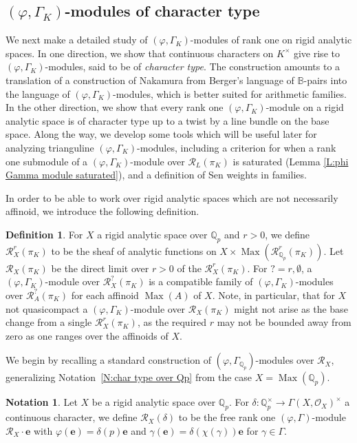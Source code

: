\documentclass[12pt]{article}
\theoremstyle{definition}
\newtheorem{defn}[theorem]{Definition}
\newtheorem{notation}[theorem]{Notation}
\numberwithin{equation}{theorem}
\newcommand{\calO}{\mathcal{O}}
\newcommand{\calR}{\mathcal{R}}
\newcommand{\QQ}{\mathbb{Q}}
\newcommand{\bbe}{\mathbf{e}}
\def\Qp{\QQ_p}
\DeclareMathOperator{\Max}{Max}
\begin{document}
\subsection{$(\varphi,\Gamma_K)$-modules of character type}\label{SS:rank one}

We next make a detailed study of $(\varphi, \Gamma_K)$-modules of rank one on rigid analytic spaces. 
In one direction, we show that continuous characters on $K^\times$ give rise to $(\varphi, \Gamma_K)$-modules, said to be of \emph{character type}. The construction
amounts to a translation of a construction of Nakamura \cite{nakamura2}
from Berger's language of $\mathbb{B}$-pairs into the language of
$(\varphi, \Gamma_K)$-modules, which is better suited for arithmetic families. In the other direction, we show that every rank one $(\varphi, \Gamma_K)$-module on a rigid analytic space is of character type up to a twist by a line bundle on the base space.
Along the way, we develop some tools which will be useful later for analyzing trianguline $(\varphi, \Gamma_K)$-modules, including a criterion for when a rank one submodule of a $(\varphi,\Gamma_K)$-module over $\calR_L(\pi_K)$ is saturated (Lemma \ref{L:phi Gamma module saturated}), and a definition of Sen weights in families.

In order to be able to work over rigid analytic spaces which are not necessarily affinoid, we introduce the following definition.

\begin{defn}
For $X$ a rigid analytic space over $\Qp$ and $r>0$, we define
$\calR^r_X(\pi_K)$ to be the sheaf of analytic functions on $X \times
\Max(\calR^r_{\Qp}(\pi_K))$.  Let $\calR_X(\pi_K)$ be the direct limit
over $r>0$ of the $\calR_X^r(\pi_K)$.  For $?=r,\emptyset$, a
$(\varphi, \Gamma_K)$-module over $\calR_X^?(\pi_K)$ is a compatible
family of $(\varphi, \Gamma_K)$-modules over $\calR_A^?(\pi_K)$ for
each affinoid $\Max(A)$ of $X$.  Note, in particular, that for $X$ not
quasicompact a $(\varphi,\Gamma_K)$-module over $\calR_X(\pi_K)$ might
not arise as the base change from a single $\calR_X^r(\pi_K)$, as the
required $r$ may not be bounded away from zero as one ranges over the
affinoids of $X$.
\end{defn}

We begin by recalling a standard construction of
$(\varphi,\Gamma_{\Qp})$-modules over $\calR_X$, generalizing
Notation~\ref{N:char type over Qp} from the case $X = \Max(\Qp)$.

\begin{notation}
\label{N:rank one module}
Let $X$ be a rigid analytic space over $\Qp$.
For $\delta: \Qp^\times \to \Gamma(X,\calO_X)^\times$ a continuous character, we define $\calR_X(\delta)$ to be the free rank one $(\varphi, \Gamma)$-module $\calR_X\cdot\bbe$ with $\varphi(\bbe) = \delta(p)\bbe$ and $\gamma(\bbe) = \delta(\chi(\gamma))\bbe$ for $\gamma \in \Gamma$.
\end{notation}
\end{document}
